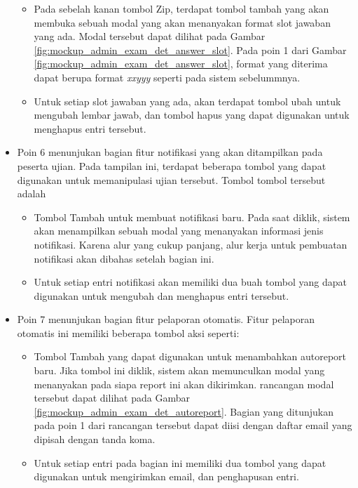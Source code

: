 \begin{itemize}
\begin{itemize}
                \item Pada sebelah kanan tombol Zip, terdapat tombol tambah yang akan membuka sebuah
                    modal yang akan menanyakan format slot jawaban yang ada. Modal tersebut dapat dilihat
                    pada Gambar \ref{fig:mockup_admin_exam_det_answer_slot}. Pada poin 1 dari Gambar
                    \ref{fig:mockup_admin_exam_det_answer_slot}, format yang diterima dapat berupa
                    format \textit{xxyyy} seperti pada sistem sebelummnya.
                    
                \item Untuk setiap slot jawaban yang ada, akan terdapat tombol ubah untuk mengubah lembar
                    jawab, dan tombol hapus yang dapat digunakan untuk menghapus entri tersebut.
            \end{itemize}
            
        \item Poin 6 menunjukan bagian fitur notifikasi yang akan ditampilkan pada peserta ujian.
            Pada tampilan ini, terdapat beberapa tombol yang dapat digunakan untuk memanipulasi ujian
            tersebut. Tombol tombol tersebut adalah
                \begin{itemize}
                    \item Tombol Tambah untuk membuat notifikasi baru. Pada saat diklik, sistem akan
                        menampilkan sebuah modal yang menanyakan informasi jenis notifikasi. 
                        Karena alur yang cukup panjang, alur kerja untuk pembuatan notifikasi akan 
                        dibahas setelah bagian ini.
                        
                    \item Untuk setiap entri notifikasi akan memiliki dua buah tombol yang dapat digunakan untuk
                        mengubah dan menghapus entri tersebut.
                \end{itemize}
            
        \item Poin 7 menunjukan bagian fitur pelaporan otomatis. Fitur pelaporan otomatis ini memiliki beberapa 
            tombol aksi seperti:
           \begin{itemize}
               \item Tombol Tambah yang dapat digunakan untuk menambahkan autoreport baru. Jika tombol ini
                    diklik, sistem akan memunculkan modal yang menanyakan pada siapa report ini akan dikirimkan.
                    rancangan modal tersebut dapat dilihat pada Gambar \ref{fig:mockup_admin_exam_det_autoreport}.
                    Bagian yang ditunjukan pada poin 1 dari rancangan tersebut dapat diisi dengan daftar email
                    yang dipisah dengan tanda koma.
                    
                \item Untuk setiap entri pada bagian ini memiliki dua tombol yang dapat digunakan untuk
                    mengirimkan email, dan penghapusan entri.
           \end{itemize}
    \end{itemize}
    
